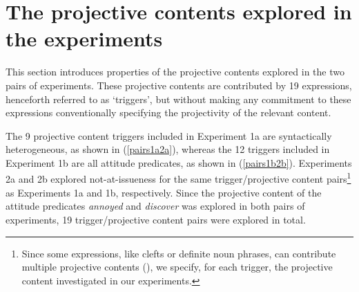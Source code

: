 \documentclass[11pt,fleqn]{article}
\newcommand{\6}{\mbox{$[\hspace*{-.6mm}[$}}
\newcommand{\9}{\mbox{$]\hspace*{-.6mm}]$}}
\begin{document}
\section{The projective contents explored in the experiments}\label{s2}

This section introduces properties of the projective contents explored in the two pairs of experiments. These projective contents are contributed by 19 expressions, henceforth referred to as `triggers', but without making any commitment to these expressions conventionally specifying the projectivity of the relevant content. 

The 9 projective content triggers included in Experiment 1a are syntactically heterogeneous, as shown in (\ref{pairs1a2a}), whereas the 12 triggers included in Experiment 1b are all attitude predicates, as shown in (\ref{pairs1b2b}). Experiments 2a and 2b explored not-at-issueness for the same trigger/projective content pairs\footnote{Since some expressions, like clefts or definite noun phrases, can contribute multiple projective contents (\citealt{brst-lang11}), we specify, for each trigger, the projective content investigated in our experiments.} as Experiments 1a and 1b, respectively. Since the projective content of the attitude predicates {\em annoyed} and {\em discover} was explored in both pairs of experiments, 19 trigger/projective content pairs were explored in total.
\end{document}
